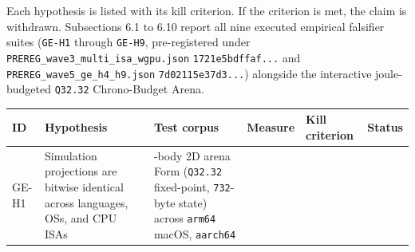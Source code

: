 \documentclass[10pt,letterpaper]{article}
\begin{document}
Each hypothesis is listed with its kill criterion. If the criterion is
met, the claim is withdrawn. Subsections 6.1 to 6.10 report all nine
executed empirical falsifier suites (\texttt{GE-H1} through
\texttt{GE-H9}, pre-registered under
\texttt{PREREG\_\allowbreak{}wave3\_\allowbreak{}multi\_\allowbreak{}isa\_\allowbreak{}wgpu.\allowbreak{}json} \texttt{1721e5bdffaf.\allowbreak{}.\allowbreak{}.\allowbreak{}}
and \texttt{PREREG\_\allowbreak{}wave5\_\allowbreak{}ge\_\allowbreak{}h4\_\allowbreak{}h9.\allowbreak{}json} \texttt{7d02115e37d3.\allowbreak{}.\allowbreak{}.\allowbreak{}})
alongside the interactive joule-budgeted \texttt{Q32.32} Chrono-Budget
Arena.

{\scriptsize\setlength{\tabcolsep}{3.0pt}\renewcommand{\arraystretch}{1.14}
\begin{longtable}[]{@{}
  >{\raggedright\arraybackslash}p{}
  >{\raggedright\arraybackslash}p{}
  >{\raggedright\arraybackslash}p{}
  >{\raggedright\arraybackslash}p{}
  >{\raggedright\arraybackslash}p{}
  >{\raggedright\arraybackslash}p{}@{}}
\toprule\noalign{}
\begin{minipage}[b]{\linewidth}\raggedright
\textbf{ID}
\end{minipage} & \begin{minipage}[b]{\linewidth}\raggedright
\textbf{Hypothesis}
\end{minipage} & \begin{minipage}[b]{\linewidth}\raggedright
\textbf{Test corpus}
\end{minipage} & \begin{minipage}[b]{\linewidth}\raggedright
\textbf{Measure}
\end{minipage} & \begin{minipage}[b]{\linewidth}\raggedright
\textbf{Kill criterion}
\end{minipage} & \begin{minipage}[b]{\linewidth}\raggedright
\textbf{Status}
\end{minipage} \\
\midrule\noalign{}
\endhead
\bottomrule\noalign{}
\endlastfoot
GE-H1 & Simulation projections are bitwise identical across languages,
OSs, and CPU ISAs & 16-body 2D arena Form (\texttt{Q32.32} fixed-point,
\texttt{732}-byte state) across \texttt{arm64} macOS, \texttt{aarch64}

\end{longtable}}
\end{document}
